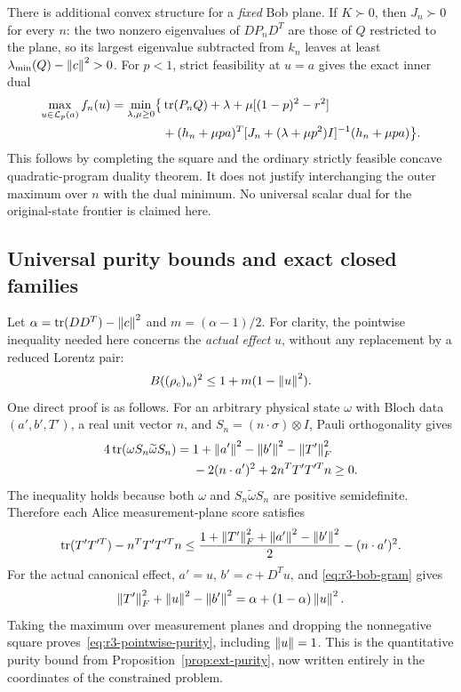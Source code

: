 There is additional convex structure for a \emph{fixed} Bob plane.
If $K\succ0$, then $J_n\succ0$ for every $n$: the two nonzero
eigenvalues of $DP_nD^T$ are those of $Q$ restricted to the plane,
so its largest eigenvalue subtracted from $k_n$ leaves at least
$\lambda_{\min}(Q)-\left\lVert c\right\rVert^2>0$.
For $p<1$, strict feasibility at $u=a$ gives the exact inner dual
\begin{align}
 \max_{u\in\mathcal L_p(a)} f_n(u)
 =\min_{\lambda,\mu\ge0}\bigl\{
 &\operatorname{tr}(P_nQ)+\lambda+\mu[(1-p)^2-r^2]\notag\\
 &+(h_n+\mu p a)^T
 [J_n+(\lambda+\mu p^2)I]^{-1}
 (h_n+\mu p a)\bigr\}.
 \label{eq:r3-fixed-plane-dual}
\end{align}
This follows by completing the square and the ordinary strictly
feasible concave quadratic-program duality theorem.
It does not justify interchanging the outer maximum over $n$ with
the dual minimum. No universal scalar dual for the original-state
frontier is claimed here.

\subsection{Universal purity bounds and exact closed families}

Let $\alpha=\operatorname{tr}(DD^T)-\left\lVert c\right\rVert^2$ and $m=(\alpha-1)/2$.
For clarity, the pointwise inequality needed here concerns the
\emph{actual effect} $u$, without any replacement by a reduced
Lorentz pair:
\begin{equation}
 B((\rho_c)_u)^2\le 1+m(1-\left\lVert u\right\rVert^2).
 \label{eq:r3-pointwise-purity}
\end{equation}
One direct proof is as follows. For an arbitrary physical state
$\omega$ with Bloch data $(a',b',T')$, a real unit vector $n$, and
$S_n=(n\cdot\sigma)\otimes I$, Pauli orthogonality gives
\begin{align*}
 4\operatorname{tr}(\omega S_n\widetilde\omega S_n)
 ={}&1+\left\lVert a'\right\rVert^2-\left\lVert b'\right\rVert^2-\left\lVert T'\right\rVert_F^2\\
 &-2(n\cdot a')^2+2n^TT'T'^Tn\ge0.
\end{align*}
The inequality holds because both $\omega$ and
$S_n\widetilde\omega S_n$ are positive semidefinite. Therefore each
Alice measurement-plane score satisfies
\[
 \operatorname{tr}(T'T'^T)-n^TT'T'^Tn
 \le\frac{1+\left\lVert T'\right\rVert_F^2+\left\lVert a'\right\rVert^2-\left\lVert b'\right\rVert^2}{2}
       -(n\cdot a')^2.
\]
For the actual canonical effect, $a'=u$, $b'=c+D^Tu$, and
\eqref{eq:r3-bob-gram} gives
\[
 \left\lVert T'\right\rVert_F^2+\left\lVert u\right\rVert^2-\left\lVert b'\right\rVert^2
   =\alpha+(1-\alpha)\left\lVert u\right\rVert^2.
\]
Taking the maximum over measurement planes and dropping the
nonnegative square proves~\eqref{eq:r3-pointwise-purity}, including
$\left\lVert u\right\rVert=1$. This is the quantitative purity bound from
Proposition~\ref{prop:ext-purity}, now written entirely in the
coordinates of the constrained problem.

